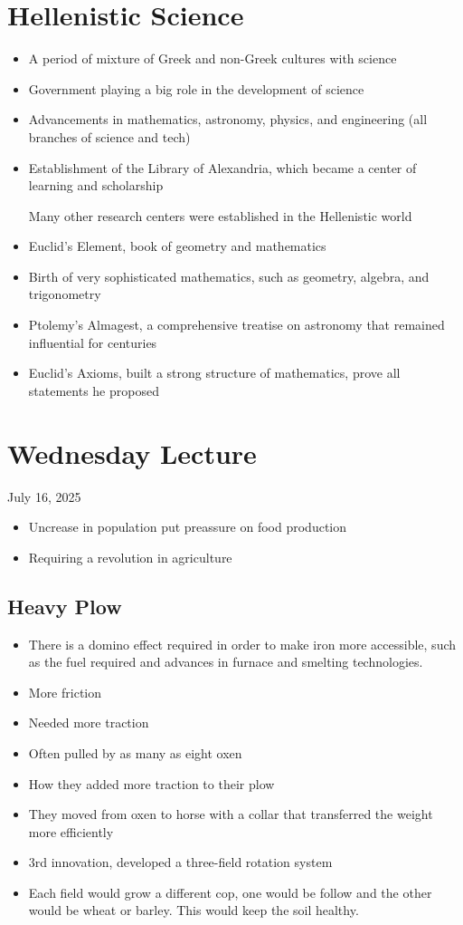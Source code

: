 \documentclass{article}
\begin{document}
\section*{Hellenistic Science}
\begin{itemize}
  \item A period of mixture of Greek and non-Greek cultures with science
  \item Government playing a big role in the development of science
  \item Advancements in mathematics, astronomy, physics, and engineering (all branches of science and tech)
  \item Establishment of the Library of Alexandria, which became a center of learning and scholarship

    Many other research centers were established in the Hellenistic world
  \item Euclid's Element, book of geometry and mathematics
  \item Birth of very sophisticated mathematics, such as geometry, algebra, and trigonometry
  \item Ptolemy's Almagest, a comprehensive treatise on astronomy that remained influential for centuries
  \item Euclid's Axioms, built a strong structure of mathematics,
    prove all statements he proposed
\end{itemize}


\section{Wednesday Lecture}
July 16, 2025

\begin{itemize}
  \item Uncrease in population put preassure on food production
  \item Requiring a revolution in agriculture
\end{itemize}

\subsection{Heavy Plow}
\begin{itemize}
  \item There is a domino effect required in order to make
    iron more accessible, such as the fuel required and advances in furnace and smelting
    technologies.
  \item More friction
  \item Needed more traction
  \item Often pulled by as many as eight oxen
  \item How they added more traction to their plow
  \item They moved from oxen to horse with a collar that transferred the weight more efficiently
  \item 3rd innovation, developed a three-field rotation system
  \item Each field would grow a different cop, one would be follow and the other would be
    wheat or barley. This would keep the soil healthy.
\end{itemize}
\end{document}

